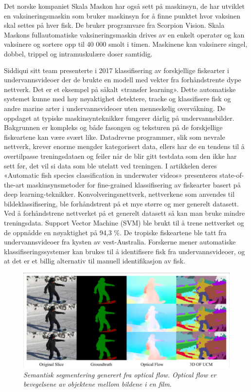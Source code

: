 Det norske kompaniet Skala Maskon har også sett på maskinsyn, de har utviklet en vaksineringsmaskin som bruker maskinsyn for å finne punktet hvor vaksinen skal settes på hver fisk. De bruker programvare fra Scorpion Vision. Skala Maskons fullautomatiske vaksineringsmaskin drives av en enkelt operatør og kan vaksinere og sortere opp til 40 000 smolt i timen. Maskinene kan vaksinere singel, dobbel, trippel og intramuskulære doser samtidig. \cite{Falstad 2016}

Siddiqui sitt team presenterte i 2017 klassifisering av forskjellige fiskearter i undervannsvideoer der de brukte en modell med vekter fra forhåndstrente dype nettverk. Det er et eksempel på såkalt «transfer learning». Dette automatiske systemet kunne med høy nøyaktighet detektere, tracke og klassifisere fisk og andre marine arter i undervannsvideoer uten menneskelig overvåkning. De oppdaget at typiske maskinsynteknikker fungerer dårlig på undervannsbilder. Bakgrunnen er kompleks og både fasongen og teksturen på de forskjellige fiskeartene kan være svært like. Datadrevne programmer, slik som nevrale nettverk, krever enorme mengder kategorisert data, ellers har de en tendens til å overtilpasse treningsdataen og feiler når de blir gitt testdata som den ikke har sett før, det vil si data som ble utelatt ved treningen. I artikkelen deres  «Automatic fish species classification in underwater videos» presenteres state-of-the-art maskinsynsmetoder for fine-grained klassifisering av fiskearter basert på deep learning-teknikker. Konvolveringsnettverk, nettverkene som anvendes til bildeklassifisering, ble forhåndstrent på et mye større og mer generelt datasett. Ved å forhåndstrene nettverket på et generelt datasett så kan man bruke mindre treningsdata. Support Vector Machine (SVM) ble brukt til å trene nettverket og de oppnådde en nøyaktighet på 94,3 \%. De tropiske fiskeartene ble tatt fra undervannsvideoer fra kysten av vest-Australia. Forskerne mener automatiske klassifiseringssystemer kan brukes til å identifisere fisk fra undervannsvideoer, og at det er et billig alternativ til manuell identifikasjon av fisk. \cite{Siddiqui m.fl. 2017}

\begin{figure}
\begin{center} 
\includegraphics[scale=0.45]{figures/optical_flow}
\caption{\small \sl Semantisk segmentering generert fra optical flow. Optical flow er bevegelsene av objektene mellom bildene i en film. \cite{Lin 2019}
\label{fig:optical_flow}} 
\end{center} 
\end{figure} 

